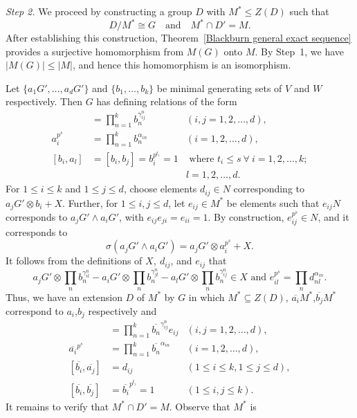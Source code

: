 \documentclass[preprint,sort&compress,12pt]{elsarticle}
\numberwithin{equation}{section}
\theoremstyle{definition}
\begin{document}
\begin{enumerate}
\textit{Step 2.} We proceed by constructing a group $D$ with $M^{*} \le Z(D)$ such that
\[
D/M^{*} \cong G \quad \text{and} \quad M^{*} \cap D' = M.
\]
After establishing this construction, Theorem~\ref{Blackburn general exact sequence}
provides a surjective homomorphism from $M(G)$ onto $M$. By Step~1,
we have $|M(G)| \le |M|$, and hence this homomorphism is an isomorphism.

Let $\{a_1G',\ldots,a_dG'\}$ and $\{b_1,\ldots,b_k\}$ be minimal generating sets of $V$ and $W$ respectively. Then $G$ has defining relations of the form
\begin{align*}
    [a_i,a_j]&=\prod \limits_{n=1}^k b_n^{\gamma_{ij}^n} & (i,j=1,2,\ldots,d), \\
    a^{p^s}_i&=\prod \limits_{n=1}^k b_n^{\alpha_{in}} & (i=1,2,\ldots,d),\\
    [b_i,a_l]&=[b_i,b_j]=b_i^{p^{t_i}}=1 & \text{ where } t_i \leq s \  \forall \ i=1,2,\ldots,k; \\
    & & l= 1,2, \ldots, d.
\end{align*}
For $1 \le i \le k$ and $1 \le j \le d$, choose elements $d_{ij} \in N$
corresponding to $a_jG' \otimes b_i + X$. Further, for $1 \le i,j \le d$,
let $e_{ij} \in M^{*}$ be elements such that $e_{ij}N$ corresponds to
$a_jG' \wedge a_iG'$, with $e_{ij}e_{ji} = e_{ii} = 1$.
By construction, $e_{ij}^{p^{s}} \in N$, and it corresponds to
\[
\sigma(a_jG' \wedge a_iG')
= a_jG' \otimes a_i^{p^{s}} + X.
\]
It follows from the definitions of $X, \ d_{ij}$, and $e_{ij}$ that
$$a_jG' \otimes \prod \limits _n b_n^{\gamma_{il}^n}-a_iG' \otimes \prod \limits _nb_n^{\gamma_{jl}^n}-a_lG' \otimes \prod \limits _n b_n^{\gamma_{ij}^n} \in X
\text{ and  }e^{p^s}_{il}=\prod \limits _n d_{nl}^{\alpha_{in}}.$$
Thus, we have an extension $D$ of $M^*$ by $G$ in which $M^* \subseteq Z(D)$, $\overline{a_i}M^*$,$\overline{b_j}M^*$ correspond to $a_i$,$b_j$ respectively and 
\begin{align*}
    [\overline{a_i},\overline{a_j}]&=\prod \limits_{n=1}^k \overline{b_n}^{\gamma_{ij}^n}e_{ij} & (i,j=1,2,\ldots,d), \\
    \overline{a_i}^{p^s}&=\prod \limits_{n=1}^k \overline{b_n}^{\alpha_{in}} & (i=1,2,\ldots,d), \\
    [\overline{b_i},\overline{a_j}]&=d_{ij} & (1 \leq i \leq k, 1 \leq j \leq d),\\
[\overline{b_i},\overline{b_j}]&=\overline{b_i}^{p^{t_i}}=1& (1 \leq i,j \leq k).
\end{align*}
It remains to verify that $M^{*} \cap D' = M$. Observe that $M^{*}$ is

\end{enumerate}
\end{document}
